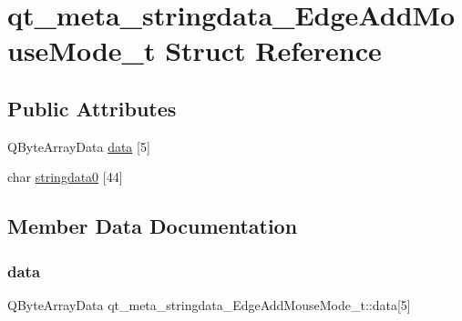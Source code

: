 \hypertarget{structqt__meta__stringdata___edge_add_mouse_mode__t}{}\section{qt\+\_\+meta\+\_\+stringdata\+\_\+\+Edge\+Add\+Mouse\+Mode\+\_\+t Struct Reference}
\label{structqt__meta__stringdata___edge_add_mouse_mode__t}
\subsection*{Public Attributes}
\begin{DoxyCompactItemize}
\item 
Q\+Byte\+Array\+Data \mbox{\hyperlink{structqt__meta__stringdata___edge_add_mouse_mode__t_ad53dccba7a27bd716c64a9764fbecf60}{data}} \mbox{[}5\mbox{]}
\item 
char \mbox{\hyperlink{structqt__meta__stringdata___edge_add_mouse_mode__t_a0d793faf9174f6cae22394b0f1d26000}{stringdata0}} \mbox{[}44\mbox{]}
\end{DoxyCompactItemize}


\subsection{Member Data Documentation}
\mbox{\label{structqt__meta__stringdata___edge_add_mouse_mode__t_ad53dccba7a27bd716c64a9764fbecf60}} 
\subsubsection{\texorpdfstring{data}{data}}
{\footnotesize\ttfamily Q\+Byte\+Array\+Data qt\+\_\+meta\+\_\+stringdata\+\_\+\+Edge\+Add\+Mouse\+Mode\+\_\+t\+::data\mbox{[}5\mbox{]}}

\mbox{\label{structqt__meta__stringdata___edge_add_mouse_mode__t_a0d793faf9174f6cae22394b0f1d26000}} 
